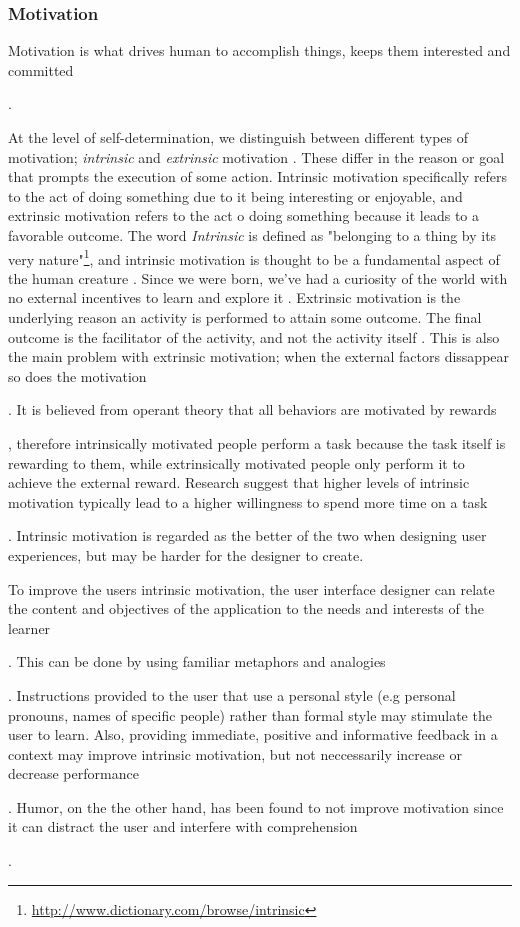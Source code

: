 \subsubsection{Motivation}

Motivation is what drives human to accomplish things, keeps them interested and committed .

At the level of self-determination, we distinguish between different types of motivation; \textit{intrinsic} and \textit{extrinsic} motivation \cite{Ryan2000a}. These differ in the reason or goal that prompts the execution of some action. Intrinsic motivation specifically refers to the act of doing something due to it being interesting or enjoyable, and extrinsic motivation refers to the act o doing something because it leads to a favorable outcome. The word \textit{Intrinsic} is defined as "belonging to a thing by its very nature"\footnote{\url{http://www.dictionary.com/browse/intrinsic}}, and intrinsic motivation is thought to be a fundamental aspect of the human creature \cite{White1959}. Since we were born, we've had a curiosity of the world with no external incentives to learn and explore it \cite{Ryan2000a}. Extrinsic motivation is the underlying reason an activity is performed to attain some outcome. The final outcome is the facilitator of the activity, and not the activity itself \cite{Ryan2000a}. This is also the main problem with extrinsic motivation; when the external factors dissappear so does the motivation . It is believed from operant theory that all behaviors are motivated by rewards , therefore intrinsically motivated people perform a task because the task itself is rewarding to them, while extrinsically motivated people only perform it to achieve the external reward. Research suggest that higher levels of intrinsic motivation typically lead to a higher willingness to spend more time on a task . Intrinsic motivation is regarded as the better of the two when designing user experiences, but may be harder for the designer to create.

To improve the users intrinsic motivation, the user interface designer can relate the content and objectives of the application to the needs and interests of the learner . This can be done by using familiar metaphors and analogies . Instructions provided to the user that use a personal style (e.g personal pronouns, names of specific people) rather than formal style may stimulate the user to learn. Also, providing immediate, positive and informative feedback in a context may improve intrinsic motivation, but not neccessarily increase or decrease performance . Humor, on the the other hand, has been found to not improve motivation since it can distract the user and interfere with comprehension .

